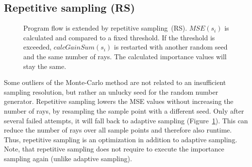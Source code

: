 \subsection{Repetitive sampling (RS)}
\begin{figure}[H]
  \centerline
  {}
  \caption{Program flow is extended by repetitive sampling~(RS).
    $MSE(s_i)$ is calculated and compared to a fixed threshold. If the
    threshold is exceeded, $calcGainSum(s_i)$ is restarted with
    another random seed and the same number of rays. The calculated
    importance values will stay the same.}
  \label{graphic:pap4}
\end{figure}
Some outliers of the Monte-Carlo method are not related to an insufficient
sampling resolution, but rather an unlucky seed for the random number generator.
Repetitive sampling lowers the MSE values without increasing the number of rays,
by resampling the sample point with a different seed. Only after several failed attempts, it will fall back to adaptive
sampling (Figure~\ref{graphic:pap4}). This can reduce the number of rays over all sample points and therefore
also runtime. Thus, repetitive sampling is an optimization in addition to adaptive sampling. 
Note, that repetitive sampling does not require to execute the importance
sampling again (unlike adaptive sampling).

